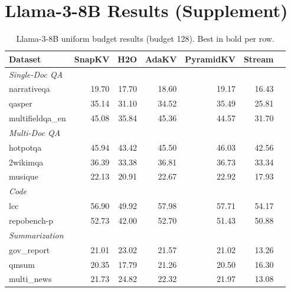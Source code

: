 \documentclass[11pt]{article}
\begin{document}
\section{Llama-3-8B Results (Supplement)}

\begin{table}[h]
\centering
\small
\renewcommand{\arraystretch}{1.15}
\begin{tabular}{@{}l r r r r r r@{}}
\toprule
\textbf{Dataset} & \textbf{SnapKV} & \textbf{H2O} & \textbf{AdaKV} & \textbf{PyramidKV} & \textbf{Stream} \\
\midrule
\textit{Single-Doc QA} \\
narrativeqa & 19.70 & 17.70 & 18.60 & 19.17 & 16.43 \\
qasper & 35.14 & 31.10 & 34.52 & 35.49 & 25.81 \\
multifieldqa\_en & 45.08 & 35.84 & 45.36 & 44.57 & 31.70 \\
\midrule
\textit{Multi-Doc QA} \\
hotpotqa & 45.94 & 43.42 & 45.50 & 46.03 & 42.56 \\
2wikimqa & 36.39 & 33.38 & 36.81 & 36.73 & 33.34 \\
musique & 22.13 & 20.91 & 22.67 & 22.92 & 17.93 \\
\midrule
\textit{Code} \\
lcc & 56.90 & 49.92 & 57.98 & 57.71 & 54.17 \\
repobench-p & 52.73 & 42.00 & 52.70 & 51.43 & 50.88 \\
\midrule
\textit{Summarization} \\
gov\_report & 21.01 & 23.02 & 21.57 & 21.02 & 13.26 \\
qmsum & 20.35 & 17.79 & 21.26 & 20.50 & 16.30 \\
multi\_news & 21.73 & 24.82 & 22.32 & 21.97 & 13.08 \\
\bottomrule
\end{tabular}
\caption{Llama-3-8B uniform budget results (budget 128). Best in bold per row.}
\label{tab:llama-results}
\end{table}
\end{document}
